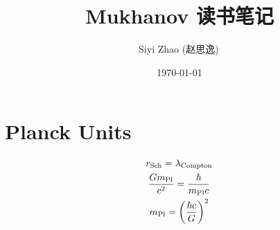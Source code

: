 \documentclass[10pt, a4paper]{ctexart}
\title{Mukhanov 读书笔记}
\author{Siyi Zhao (赵思逸)\,\orcidlink{0009-0001-4492-5158}}
\date{\today}
\begin{document}
\maketitle
\tableofcontents

\section*{Planck Units}

\begin{gather}
    r_{\rm Sch} = \lambda_{\rm Compton} \\
    \frac{G m_{\rm Pl}}{c^2} = \frac{\hbar}{m_{\rm Pl} c} \\ 
    m_{\rm Pl} = \qty(\frac{\hbar c}{G})^2
\end{gather}


% 
% 
\end{document}
